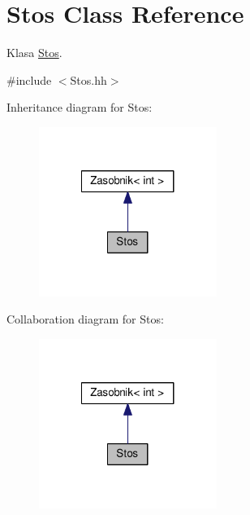 \hypertarget{a00016}{}\section{Stos Class Reference}
\label{a00016}


Klasa \hyperlink{a00016}{Stos}.  




{\ttfamily \#include $<$Stos.\+hh$>$}



Inheritance diagram for Stos\+:
\nopagebreak
\begin{figure}[H]
\begin{center}
\leavevmode
\includegraphics[width=164pt]{a00145}
\end{center}
\end{figure}


Collaboration diagram for Stos\+:
\nopagebreak
\begin{figure}[H]
\begin{center}
\leavevmode
\includegraphics[width=164pt]{a00146}
\end{center}
\end{figure}
